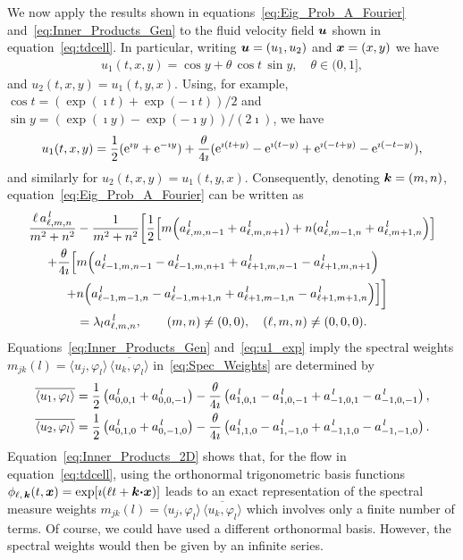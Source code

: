 \documentclass[amsa]{ipart}
\begin{document}
We now apply the results shown in
equations~\eqref{eq:Eig_Prob_A_Fourier}  
and~\eqref{eq:Inner_Products_Gen} to the fluid velocity field
$\boldsymbol{u}$ shown in equation~\eqref{eq:tdcell}. In particular, writing
$\boldsymbol{u}=(u_1,u_2)$ and $\boldsymbol{x}=(x,y)$ we have 
%
\begin{align}
  u_1(t,x,y)=\cos{y}+\theta\,\cos{t}\,\sin{y},
  \quad
  \theta \in (0,1],
\end{align}
%
and $u_2(t,x,y)=u_1(t,y,x)$. Using, for example, $\cos{t}=(\exp(\imath
t)+\exp(-\imath t))/2$ and $\sin{y}=(\exp(\imath y)-\exp(-\imath y))/(2\imath)$, we have   
%
\begin{align}\label{eq:u1_exp}
  u_1(t,x,y)=\frac{1}{2}(\e^{\imath y}+\e^{-\imath y})
           +\frac{\theta}{4\imath}(\e^{\imath(t+y)}-\e^{\imath(t-y)}+\e^{\imath(-t+y)}-\e^{\imath (-t-y)}),
\end{align}
%
and similarly for $u_2(t,x,y)=u_1(t,y,x)$. Consequently, denoting
$\boldsymbol{k}=(m,n)$, equation~\eqref{eq:Eig_Prob_A_Fourier} can be written
as 
%
\begin{align}\label{eq:Fourier_Coef_System}
 \frac{\ell\,a^{\,l}_{\ell,m,n}}{m^2+n^2}
 &-\frac{1}{m^2+n^2}
 \bigg[
 \frac{1}{2}
 \Big[m\Big(a^{\,l}_{\ell,m,n-1}+a^{\,l}_{\ell,m,n+1})+n(a^{\,l}_{\ell,m-1,n}+a^{\,l}_{\ell,m+1,n}\Big)\Big]
\\
+\frac{\theta}{4\imath}
\Big[
&m\Big(a^{\,l}_{\ell-1,m,n-1}-a^{\,l}_{\ell-1,m,n+1}+a^{\,l}_{\ell+1,m,n-1}-a^{\,l}_{\ell+1,m,n+1}\Big)
\notag\\
+&n\Big(a^{\,l}_{\ell-1,m-1,n}-a^{\,l}_{\ell-1,m+1,n}+a^{\,l}_{\ell+1,m-1,n}-a^{\,l}_{\ell+1,m+1,n}\Big)
\Big]
\bigg]
\notag\\
&=\lambda_la^{\,l}_{\ell,m,n}, \qquad (m,n)\neq(0,0), \quad (\ell,m,n)\neq(0,0,0).
\notag
\end{align}
%
Equations~\eqref{eq:Inner_Products_Gen}
and~\eqref{eq:u1_exp} 
imply the spectral weights
$m_{jk}(l)=\langle u_j,\varphi_l\rangle\,\overline{\langle u_k,\varphi_l\rangle}$ in~\eqref{eq:Spec_Weights}
are determined by   
%
\begin{align}\label{eq:Inner_Products_2D}
  \overline{\langle u_1,\varphi_l\rangle}
  =\frac{1}{2}\left(a^{\,l}_{0,0,1}+a^{\,l}_{0,0,-1}\right)
      -\frac{\theta}{4\imath}\left(a^{\,l}_{1,0,1}-a^{\,l}_{1,0,-1}+a^{\,l}_{-1,0,1}-a^{\,l}_{-1,0,-1}\right), 
               \\
  \overline{\langle u_2,\varphi_l\rangle}=\frac{1}{2}\left(a^{\,l}_{0,1,0}+a^{\,l}_{0,-1,0}\right)
       -\frac{\theta}{4\imath}\left(a^{\,l}_{1,1,0}-a^{\,l}_{1,-1,0}+a^{\,l}_{-1,1,0}-a^{\,l}_{-1,-1,0}\right).
               \notag
\end{align}
%
Equation~\eqref{eq:Inner_Products_2D} shows that, for the flow in
equation~\eqref{eq:tdcell}, using the orthonormal trigonometric basis
functions $\phi_{\ell,\,\boldsymbol{k}}(t,\boldsymbol{x})=\exp[\imath(\ell t+\boldsymbol{k}\mbox{\boldmath${\cdot}$}\boldsymbol{x})]$ leads
to an exact representation of the spectral measure weights
$m_{jk}(l)=\langle u_j,\varphi_l\rangle\,\overline{\langle u_k,\varphi_l\rangle}$ which involves only a
finite number of terms. Of course, we could have used a different
orthonormal basis. However, the spectral weights would then be given
by an infinite series.    
\end{document}
